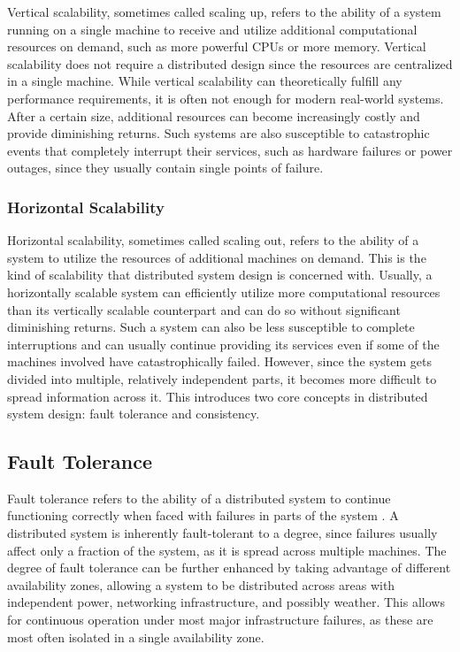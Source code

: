 Vertical scalability, sometimes called scaling up, refers to the ability of a system running on a single machine to receive and utilize additional computational resources on demand, such as more powerful CPUs or more memory. Vertical scalability does not require a distributed design since the resources are centralized in a single machine. While vertical scalability can theoretically fulfill any performance requirements, it is often not enough for modern real-world systems. After a certain size, additional resources can become increasingly costly and provide diminishing returns. Such systems are also susceptible to catastrophic events that completely interrupt their services, such as hardware failures or power outages, since they usually contain single points of failure.

\subsubsection{Horizontal Scalability}

Horizontal scalability, sometimes called scaling out, refers to the ability of a system to utilize the resources of additional machines on demand. This is the kind of scalability that distributed system design is concerned with. Usually, a horizontally scalable system can efficiently utilize more computational resources than its vertically scalable counterpart and can do so without significant diminishing returns. Such a system can also be less susceptible to complete interruptions and can usually continue providing its services even if some of the machines involved have catastrophically failed. However, since the system gets divided into multiple, relatively independent parts, it becomes more difficult to spread information across it. This introduces two core concepts in distributed system design: fault tolerance and consistency.

\subsection{Fault Tolerance}

Fault tolerance refers to the ability of a distributed system to continue functioning correctly when faced with failures in parts of the system \cite{van2017distributed}. A distributed system is inherently fault-tolerant to a degree, since failures usually affect only a fraction of the system, as it is spread across multiple machines. The degree of fault tolerance can be further enhanced by taking advantage of different availability zones, allowing a system to be distributed across areas with independent power, networking infrastructure, and possibly weather. This allows for continuous operation under most major infrastructure failures, as these are most often isolated in a single availability zone.

